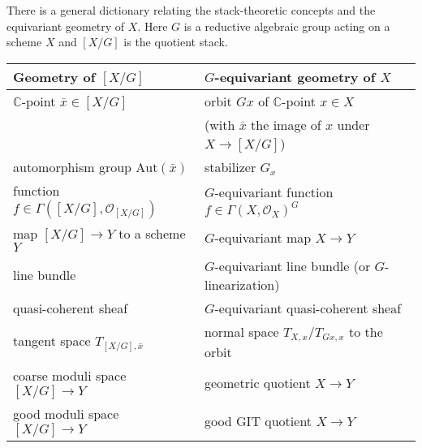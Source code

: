 \documentclass[12pt]{article}
\begin{document}
\begin{remark}
  There is a general dictionary relating the stack-theoretic concepts and the equivariant geometry of $X$. Here $G$ is a reductive algebraic group acting on a scheme $X$ and $[X/G]$ is the quotient stack.
  \begin{center}
    \begin{tabular}{|l|l|}
      \hline
      \textbf{Geometry of $[X/G]$} & \textbf{$G$-equivariant geometry of $X$}                   \\[1ex]
      \hline
      $\mathbb{C}$-point $\bar{x} \in [X/G]$
                                   & orbit $Gx$ of $\mathbb{C}$-point $x \in X$                 \\
                                   & (with $\bar{x}$ the image of $x$ under $X \to [X/G]$)      \\[1ex]
      \hline
      automorphism group $\mathrm{Aut}(\bar{x})$
                                   & stabilizer $G_x$                                           \\[1ex]
      \hline
      function $f \in \Gamma([X/G],\mathcal{O}_{[X/G]})$
                                   & $G$-equivariant function $f \in \Gamma(X,\mathcal{O}_X)^G$ \\[1ex]
      \hline
      map $[X/G] \to Y$ to a scheme $Y$
                                   & $G$-equivariant map $X \to Y$                              \\[1ex]
      \hline
      line bundle
                                   & $G$-equivariant line bundle (or $G$-linearization)         \\[1ex]
      \hline
      quasi-coherent sheaf
                                   & $G$-equivariant quasi-coherent sheaf                       \\[1ex]
      \hline
      tangent space $T_{[X/G],\bar{x}}$
                                   & normal space $T_{X,x}/T_{Gx,x}$ to the orbit               \\[1ex]
      \hline
      coarse moduli space $[X/G] \to Y$
                                   & geometric quotient $X \to Y$                               \\[1ex]
      \hline
      good moduli space $[X/G] \to Y$
                                   & good GIT quotient $X \to Y$                                \\[1ex]
      \hline
    \end{tabular}
  \end{center}
\end{remark}
\end{document}
